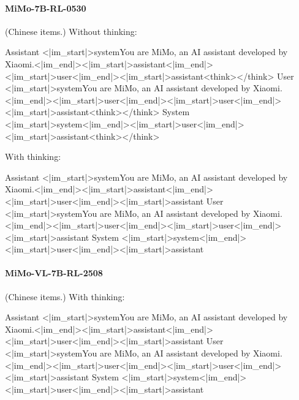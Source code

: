 \paragraph{MiMo-7B-RL-0530} (Chinese items.)
\noindent Without thinking:
\begin{Rendering}
Assistant  <|im_start|>system\NL{}You are MiMo, an AI assistant developed by Xiaomi.<|im_end|>\NL{}<|im_start|>assistant\NL{}<|im_end|>\NL{}<|im_start|>user\NL{}<|im_end|>\NL{}<|im_start|>assistant\NL{}<think>\NL{}\NL{}</think>\NL{}
User       <|im_start|>system\NL{}You are MiMo, an AI assistant developed by Xiaomi.<|im_end|>\NL{}<|im_start|>user\NL{}<|im_end|>\NL{}<|im_start|>user\NL{}<|im_end|>\NL{}<|im_start|>assistant\NL{}<think>\NL{}\NL{}</think>\NL{}
System     <|im_start|>system\NL{}<|im_end|>\NL{}<|im_start|>user\NL{}<|im_end|>\NL{}<|im_start|>assistant\NL{}<think>\NL{}\NL{}</think>\NL{}
\end{Rendering}
\noindent With thinking:
\begin{Rendering}
Assistant  <|im_start|>system\NL{}You are MiMo, an AI assistant developed by Xiaomi.<|im_end|>\NL{}<|im_start|>assistant\NL{}<|im_end|>\NL{}<|im_start|>user\NL{}<|im_end|>\NL{}<|im_start|>assistant\NL{}
User       <|im_start|>system\NL{}You are MiMo, an AI assistant developed by Xiaomi.<|im_end|>\NL{}<|im_start|>user\NL{}<|im_end|>\NL{}<|im_start|>user\NL{}<|im_end|>\NL{}<|im_start|>assistant\NL{}
System     <|im_start|>system\NL{}<|im_end|>\NL{}<|im_start|>user\NL{}<|im_end|>\NL{}<|im_start|>assistant\NL{}
\end{Rendering}
\paragraph{MiMo-VL-7B-RL-2508} (Chinese items.)
\noindent With thinking:
\begin{Rendering}
Assistant  <|im_start|>system\NL{}You are MiMo, an AI assistant developed by Xiaomi.<|im_end|>\NL{}<|im_start|>assistant\NL{}<|im_end|>\NL{}<|im_start|>user\NL{}<|im_end|>\NL{}<|im_start|>assistant\NL{}
User       <|im_start|>system\NL{}You are MiMo, an AI assistant developed by Xiaomi.<|im_end|>\NL{}<|im_start|>user\NL{}<|im_end|>\NL{}<|im_start|>user\NL{}<|im_end|>\NL{}<|im_start|>assistant\NL{}
System     <|im_start|>system\NL{}<|im_end|>\NL{}<|im_start|>user\NL{}<|im_end|>\NL{}<|im_start|>assistant\NL{}
\end{Rendering}
